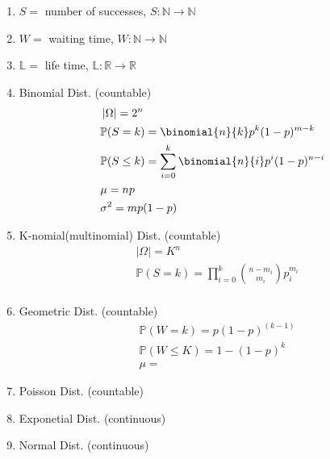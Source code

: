 \message{ !name(review.tex)}\documentclass[12pt]{article}
\newcommand{\abs}[1]{\left| #1 \right|} %
\renewcommand{\=}[1]{\stackrel{#1}{=}} %
\theoremstyle{definition}
\theoremstyle{remark}
\begin{document}
\begin{enumerate}
  \item $S = $ number of successes, $S: \mathbb{N} \rightarrow \mathbb{N}$
  \item $W=$ waiting time, $W:\mathbb{N} \rightarrow \mathbb{N}$
  \item $\mathbb{L}=$ life time, $\mathbb{L}: \mathbb{R} \rightarrow \mathbb{R}$
  \item Binomial Dist. (countable)
    \begin{align*}
      &\abs{\Omega} = 2^n \\
      &\mathbb{P}(S = k) = \binomial{n}{k} p^k(1-p)^{m-k} \\
      &\mathbb{P}(S \leq k) = \sum_{i=0}^k
      \binomial{n}{i}p^i(1-p)^{n-i} \\
      &\mu = np \\
      &\sigma^2 = mp(1-p)
    \end{align*}
  \item K-nomial(multinomial) Dist. (countable)
    \begin{align*}
      &\abs{\Omega} = K^n \\
      &\mathbb{P}(S = k) = \prod_{i=0}^k \binom{n-m_i}{m_i} p_i^{m_i} \\
    \end{align*}
  \item Geometric Dist. (countable)
    \begin{align*}
      & \mathbb{P}(W=k)=p(1-p)^{(k-1)} \\
      & \mathbb{P}(W\leq K) = 1-(1-p)^k \\
      & \mu = 
    \end{align*}
  \item Poisson Dist. (countable)
  \item Exponetial Dist. (continuous)
  \item Normal Dist. (continuous)
  \end{enumerate}
\end{document}
